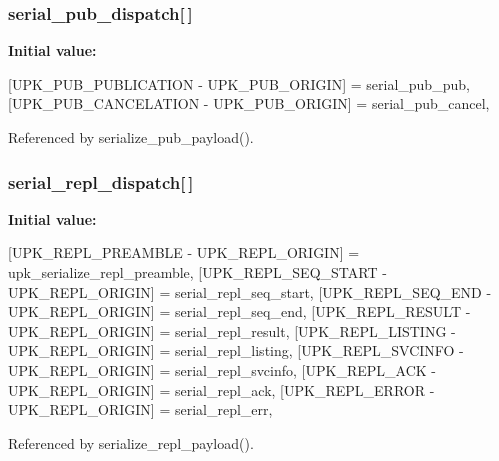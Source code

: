 \subsubsection[{serial\_\-pub\_\-dispatch}]{ {\bf serial\_\-pub\_\-dispatch}[$\,$]\hspace{0.3cm}{\ttfamily  [static]}}\label{upk__v0__protocol__serializer_8c_a6e02e12734343c43736cd33fc08c8906}
{\bfseries Initial value:}
\begin{DoxyCode}
 {
    [UPK_PUB_PUBLICATION - UPK_PUB_ORIGIN] = serial_pub_pub,
    [UPK_PUB_CANCELATION - UPK_PUB_ORIGIN] = serial_pub_cancel,
}
\end{DoxyCode}


Referenced by serialize\_\-pub\_\-payload().

\subsubsection[{serial\_\-repl\_\-dispatch}]{ {\bf serial\_\-repl\_\-dispatch}[$\,$]\hspace{0.3cm}{\ttfamily  [static]}}\label{upk__v0__protocol__serializer_8c_a8ac8faf1c7767fa5373b1857d3de9e02}
{\bfseries Initial value:}
\begin{DoxyCode}
 {
    [UPK_REPL_PREAMBLE - UPK_REPL_ORIGIN] = upk_serialize_repl_preamble,
    [UPK_REPL_SEQ_START - UPK_REPL_ORIGIN] = serial_repl_seq_start,
    [UPK_REPL_SEQ_END - UPK_REPL_ORIGIN] = serial_repl_seq_end,
    [UPK_REPL_RESULT - UPK_REPL_ORIGIN] = serial_repl_result,
    [UPK_REPL_LISTING - UPK_REPL_ORIGIN] = serial_repl_listing,
    [UPK_REPL_SVCINFO - UPK_REPL_ORIGIN] = serial_repl_svcinfo,
    [UPK_REPL_ACK - UPK_REPL_ORIGIN] = serial_repl_ack,
    [UPK_REPL_ERROR - UPK_REPL_ORIGIN] = serial_repl_err,
}
\end{DoxyCode}


Referenced by serialize\_\-repl\_\-payload().

